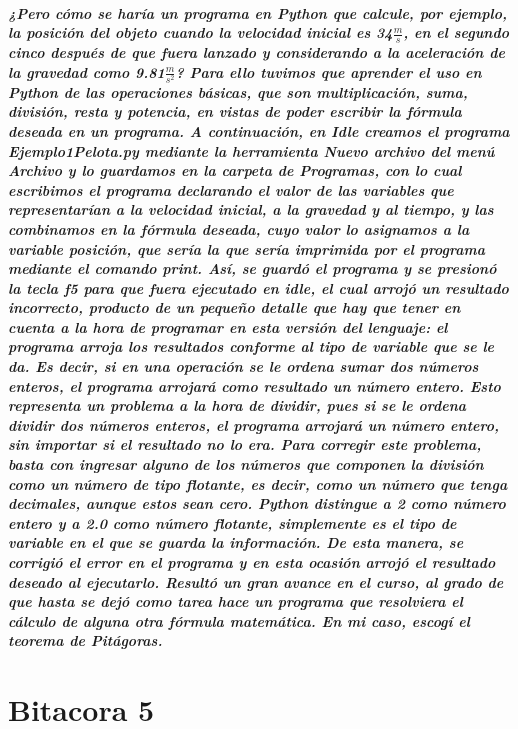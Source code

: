 \documentclass{book}
\begin{document}
	\paragraph{¿Pero cómo se haría un programa en Python que calcule, por ejemplo, la posición del objeto cuando la velocidad inicial es 34$\frac{m}{s}$, en el segundo cinco después de que fuera lanzado y considerando a la aceleración de la gravedad como 9.81$\frac{m}{s^2}$? Para ello tuvimos que aprender el uso en Python de las operaciones básicas, que son multiplicación, suma, división, resta y potencia, en vistas de poder escribir la fórmula deseada en un programa. A continuación, en Idle creamos el programa Ejemplo1Pelota.py mediante la herramienta Nuevo archivo del menú Archivo y lo guardamos en la carpeta de Programas, con lo cual escribimos el programa declarando el valor de las variables que representarían a la velocidad inicial, a la gravedad y al tiempo, y las combinamos en la fórmula deseada, cuyo valor lo asignamos a la variable posición, que sería la que sería imprimida por el programa mediante el comando print. Así, se guardó el programa y se presionó la tecla f5 para que fuera ejecutado en idle, el cual arrojó un resultado incorrecto, producto de un pequeño detalle que hay que tener en cuenta a la hora de programar en esta versión del lenguaje: el programa arroja los resultados conforme al tipo de variable que se le da. Es decir, si en una operación se le ordena sumar dos números enteros, el programa arrojará como resultado un número entero. Esto representa un problema a la hora de dividir, pues si se le ordena dividir dos números enteros, el programa arrojará un número entero, sin importar si el resultado no lo era. Para corregir este problema, basta con ingresar alguno de los números que componen la división como un número de tipo flotante, es decir, como un número que tenga decimales, aunque estos sean cero. Python distingue a 2 como número entero y a 2.0 como número flotante, simplemente es el tipo de variable en el que se guarda la información. De esta manera, se corrigió el error en el programa y en esta ocasión arrojó el resultado deseado al ejecutarlo. Resultó un gran avance en el curso, al grado de que hasta se dejó como tarea hace un programa que resolviera el cálculo de alguna otra fórmula matemática. En mi caso, escogí el teorema de Pitágoras.}
	\chapter{Bitacora 5}
\end{document}
